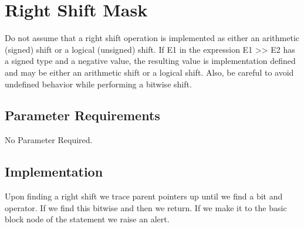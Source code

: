 %
%

\section{Right Shift Mask}
\label{RightShiftMask::overview}

Do not assume that a right shift operation is implemented as either an
arithmetic (signed) shift or a logical (unsigned) shift. If E1 in the
expression E1 >> E2 has a signed type and a negative value, the
resulting value is implementation defined and may be either an
arithmetic shift or a logical shift. Also, be careful to avoid
undefined behavior while performing a bitwise shift.
\subsection{Parameter Requirements}

No Parameter Required.

\subsection{Implementation}

Upon finding a right shift we trace parent pointers up until we find
a bit and operator.  If we find this bitwise and then we return.  If
we make it to the basic block node of the statement we raise an alert. 


